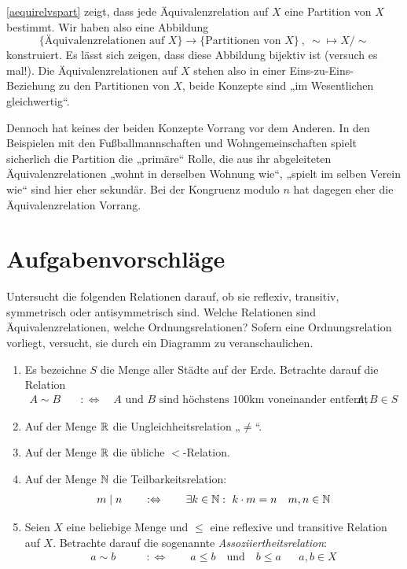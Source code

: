\begin{bem}
    \cref{aequirelvspart} zeigt, dass jede Äquivalenzrelation auf $X$ eine Partition von $X$ bestimmt. Wir haben also eine Abbildung
        \[ \{ \text{Äquivalenzrelationen auf $X$}\} \to \{ \text{Partitionen von $X$}\} \ ,\ {\sim} \mapsto X/{\sim} \]
    konstruiert. Es lässt sich zeigen, dass diese Abbildung bijektiv ist (versuch es mal!). Die Äquivalenzrelationen auf $X$ stehen also in einer Eins-zu-Eins-Beziehung zu den Partitionen von $X$, beide Konzepte sind „im Wesentlichen gleichwertig“.
    
    Dennoch hat keines der beiden Konzepte Vorrang vor dem Anderen. In den Beispielen mit den Fußballmannschaften und Wohngemeinschaften spielt sicherlich die Partition die „primäre“ Rolle, die aus ihr abgeleiteten Äquivalenzrelationen „wohnt in derselben Wohnung wie“, „spielt im selben Verein wie“ sind hier eher sekundär. Bei der Kongruenz modulo $n$ hat dagegen eher die Äquivalenzrelation Vorrang.
\end{bem}





\clearpage
\section{Aufgabenvorschläge}


\begin{aufg}
    Untersucht die folgenden Relationen darauf, ob sie reflexiv, transitiv, symmetrisch oder antisymmetrisch sind. Welche Relationen sind Äquivalenzrelationen, welche Ordnungsrelationen? Sofern eine Ordnungsrelation vorliegt, versucht, sie durch ein Diagramm zu veranschaulichen.
    \begin{enumerate}
        \item Es bezeichne $S$ die Menge aller Städte auf der Erde. Betrachte darauf die Relation
        \begin{align*}
            A \sim B \quad& :\Leftrightarrow\quad \text{$A$ und $B$ sind höchstens 100km voneinander entfernt} && A,B\in S
        \end{align*}
        \item Auf der Menge $\mathbb R$ die Ungleichheitsrelation „$\neq$“.
        \item Auf der Menge $\mathbb R$ die übliche $<$-Relation.
        \item Auf der Menge $\mathbb N$ die Teilbarkeitsrelation:
        \begin{align*}
            m\mid n \qquad:\Leftrightarrow\qquad \exists k\in \N:\ k\cdot m=n && m,n\in \N
        \end{align*}
        \item Seien $X$ eine beliebige Menge und $\le$ eine reflexive und transitive Relation auf $X$. Betrachte darauf die sogenannte \emph{Assoziiertheitsrelation}:
        \begin{align*}
            a\sim b \qquad&:\Leftrightarrow\qquad a\le b\quad\text{und}\quad b\le a && a,b\in X
        \end{align*}
    \end{enumerate}
\end{aufg}


